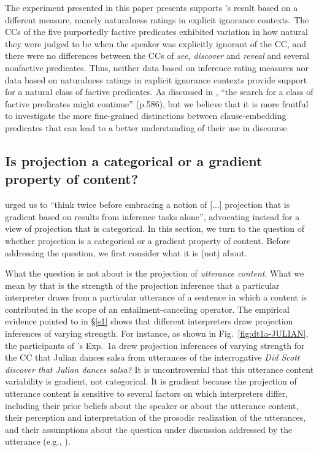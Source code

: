 \documentclass[11pt,fleqn]{article}
\newcommand{\6}{\mbox{$[\hspace*{-.6mm}[$}}
\newcommand{\9}{\mbox{$]\hspace*{-.6mm}]$}}
\newcommand{\citepos}[1]{\citeauthor{#1}'s \citeyear{#1}}
\begin{document}
The experiment presented in this paper presents supports \citepos{degen-tonhauser-language} result based on a different measure, namely naturalness ratings in explicit ignorance contexts. The CCs of the five purportedly factive predicates exhibited variation in how natural they were judged to be when the speaker was explicitly ignorant of the CC, and there were no differences between the CCs of {\em see, discover} and {\em reveal} and several nonfactive predicates. Thus, neither data based on inference rating measures nor data based on naturalness ratings in explicit ignorance contexts provide support for a natural class of factive predicates. As discussed in \citealt{degen-tonhauser-language}, ``the search for a class of factive predicates might continue'' (p.586), but we believe that it is more fruitful to investigate the more fine-grained distinctions between clause-embedding predicates that can lead to a better understanding of their use in discourse. 

\subsection{Is projection a categorical or a gradient property of content?}

\citealt[497]{mandelkern-etal2020} urged us to ``think twice before embracing a notion of [...] projection that is gradient based on results from inference tasks alone'', advocating instead for a view of projection that is categorical. In this section, we turn to the question of whether projection is a categorical or a gradient property of content. Before addressing the question, we first consider what it is (not) about.

What the question is not about is the projection of {\em utterance content}. What we mean by that is the strength of the projection inference that a particular interpreter draws from a particular utterance of a sentence in which a content is contributed in the scope of an entailment-canceling operator. The empirical evidence pointed to in \S\ref{s1} shows that different interpreters draw projection inferences of varying strength. For instance, as shown in Fig.~\ref{fig:dt1a-JULIAN}, the participants of \citepos{degen-tonhauser-language} Exp.~1a drew projection inferences of varying strength for the CC that Julian dances salsa from utterances of the interrogative {\em Did Scott discover that Julian dances salsa?} It is uncontroversial that this utterance content variability is gradient, not categorical. It is gradient because the projection of utterance content is sensitive to several factors on which interpreters differ, including their prior beliefs about the speaker or about the utterance content, their perception and interpretation of the prosodic realization of the utterances, and their assumptions about the question under discussion addressed by the utterance (e.g., \citealt{djaerv-bacovcin2020,degen-tonhauser-openmind,mahler2020,mahler-thesis,tonhauser-salt26,tbd-variability,tonhauser-etal-sub23}).
\end{document}
